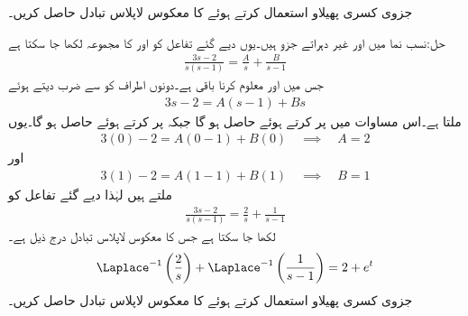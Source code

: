جزوی کسری پھیلاو استعمال کرتے ہوئے  کا معکوس لاپلاس تبادل حاصل کریں۔

حل:نسب نما میں  اور  غیر دہراتے جزو ہیں۔یوں دیے گئے تفاعل کو  اور  کا مجموعہ لکھا جا سکتا ہے
\begin{align*}
\frac{3s-2}{s(s-1)}=\frac{A}{s}+\frac{B}{s-1}
\end{align*}
جس میں  اور  معلوم کرنا باقی ہے۔دونوں اطراف کو  سے ضرب دیتے ہوئے
\begin{align*}
3s-2=A(s-1)+Bs
\end{align*}
ملتا ہے۔اس مساوات میں  پر کرتے ہوئے  حاصل ہو گا جبکہ  پر کرتے ہوئے  حاصل ہو گا۔یوں
\begin{align*}
3(0)-2=A(0-1)+B(0)\quad \implies \quad A=2
\end{align*} 
اور
\begin{align*}
3(1)-2=A(1-1)+B(1)\quad \implies \quad B=1
\end{align*}
ملتے ہیں لہٰذا دیے گئے تفاعل کو
\begin{align*}
\frac{3s-2}{s(s-1)}=\frac{2}{s}+\frac{1}{s-1}
\end{align*}
لکھا جا سکتا ہے جس کا معکوس لاپلاس تبادل درج ذیل ہے۔
\begin{align*}
\Laplace^{-1}\left(\frac{2}{s}\right)+\Laplace^{-1}\left(\frac{1}{s-1}\right)=2+e^t
\end{align*}
جزوی کسری پھیلاو استعمال کرتے ہوئے  کا معکوس لاپلاس تبادل حاصل کریں۔

